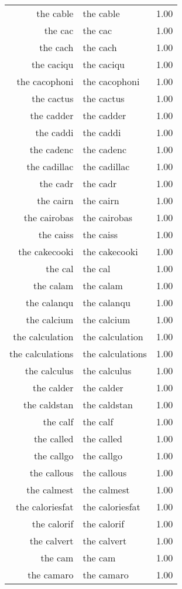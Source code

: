 \begin{table}[ht]
\begin{tabular}{rlr}
  the cable & the cable & 1.00 \\ 
  the cac & the cac & 1.00 \\ 
  the cach & the cach & 1.00 \\ 
  the caciqu & the caciqu & 1.00 \\ 
  the cacophoni & the cacophoni & 1.00 \\ 
  the cactus & the cactus & 1.00 \\ 
  the cadder & the cadder & 1.00 \\ 
  the caddi & the caddi & 1.00 \\ 
  the cadenc & the cadenc & 1.00 \\ 
  the cadillac & the cadillac & 1.00 \\ 
  the cadr & the cadr & 1.00 \\ 
  the cairn & the cairn & 1.00 \\ 
  the cairobas & the cairobas & 1.00 \\ 
  the caiss & the caiss & 1.00 \\ 
  the cakecooki & the cakecooki & 1.00 \\ 
  the cal & the cal & 1.00 \\ 
  the calam & the calam & 1.00 \\ 
  the calanqu & the calanqu & 1.00 \\ 
  the calcium & the calcium & 1.00 \\ 
  the calculation & the calculation & 1.00 \\ 
  the calculations & the calculations & 1.00 \\ 
  the calculus & the calculus & 1.00 \\ 
  the calder & the calder & 1.00 \\ 
  the caldstan & the caldstan & 1.00 \\ 
  the calf & the calf & 1.00 \\ 
  the called & the called & 1.00 \\ 
  the callgo & the callgo & 1.00 \\ 
  the callous & the callous & 1.00 \\ 
  the calmest & the calmest & 1.00 \\ 
  the caloriesfat & the caloriesfat & 1.00 \\ 
  the calorif & the calorif & 1.00 \\ 
  the calvert & the calvert & 1.00 \\ 
  the cam & the cam & 1.00 \\ 
  the camaro & the camaro & 1.00 \\ 

\end{tabular}
\end{table}
